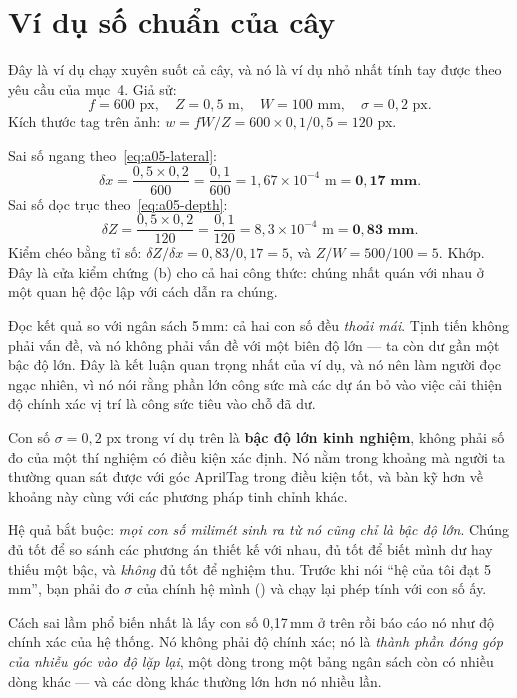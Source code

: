 \documentclass[../../marker.tex]{subfiles}
\begin{document}
\section{Ví dụ số chuẩn của cây}

Đây là ví dụ chạy xuyên suốt cả cây, và nó là ví dụ nhỏ nhất tính tay được theo yêu cầu của  mục~4. Giả sử:
\[
f = 600 \text{ px}, \quad Z = 0{,}5 \text{ m}, \quad W = 100 \text{ mm}, \quad \sigma = 0{,}2 \text{ px}.
\]
Kích thước tag trên ảnh: \(w = fW/Z = 600 \times 0{,}1/0{,}5 = 120\) px.

Sai số ngang theo~\eqref{eq:a05-lateral}:
\[
\delta x = \frac{0{,}5 \times 0{,}2}{600} = \frac{0{,}1}{600} = 1{,}67\times10^{-4}\text{ m} = \mathbf{0{,}17 \text{ mm}}.
\]
Sai số dọc trục theo~\eqref{eq:a05-depth}:
\[
\delta Z = \frac{0{,}5 \times 0{,}2}{120} = \frac{0{,}1}{120} = 8{,}3\times10^{-4}\text{ m} = \mathbf{0{,}83 \text{ mm}}.
\]
Kiểm chéo bằng tỉ số: \(\delta Z/\delta x = 0{,}83/0{,}17 = 5\), và \(Z/W = 500/100 = 5\). Khớp. Đây là cửa kiểm chứng (b) cho cả hai công thức: chúng nhất quán với nhau ở một quan hệ độc lập với cách dẫn ra chúng.

Đọc kết quả so với ngân sách 5\,mm: cả hai con số đều \emph{thoải mái}. Tịnh tiến không phải vấn đề, và nó không phải vấn đề với một biên độ lớn --- ta còn dư gần một bậc độ lớn. Đây là kết luận quan trọng nhất của ví dụ, và nó nên làm người đọc ngạc nhiên, vì nó nói rằng phần lớn công sức mà các dự án bỏ vào việc cải thiện độ chính xác vị trí là công sức tiêu vào chỗ đã dư.

\begin{cambay}
Con số \(\sigma = 0{,}2\) px trong ví dụ trên là \textbf{bậc độ lớn kinh nghiệm}, không phải số đo của một thí nghiệm có điều kiện xác định. Nó nằm trong khoảng mà người ta thường quan sát được với góc AprilTag trong điều kiện tốt, và  bàn kỹ hơn về khoảng này cùng với các phương pháp tinh chỉnh khác.

Hệ quả bắt buộc: \emph{mọi con số milimét sinh ra từ nó cũng chỉ là bậc độ lớn}. Chúng đủ tốt để so sánh các phương án thiết kế với nhau, đủ tốt để biết mình dư hay thiếu một bậc, và \emph{không} đủ tốt để nghiệm thu. Trước khi nói ``hệ của tôi đạt 5\,mm'', bạn phải đo \(\sigma\) của chính hệ mình () và chạy lại phép tính với con số ấy.

Cách sai lầm phổ biến nhất là lấy con số 0,17\,mm ở trên rồi báo cáo nó như độ chính xác của hệ thống. Nó không phải độ chính xác; nó là \emph{thành phần đóng góp của nhiễu góc vào độ lặp lại}, một dòng trong một bảng ngân sách còn có nhiều dòng khác --- và các dòng khác thường lớn hơn nó nhiều lần.
\end{cambay}
\end{document}
